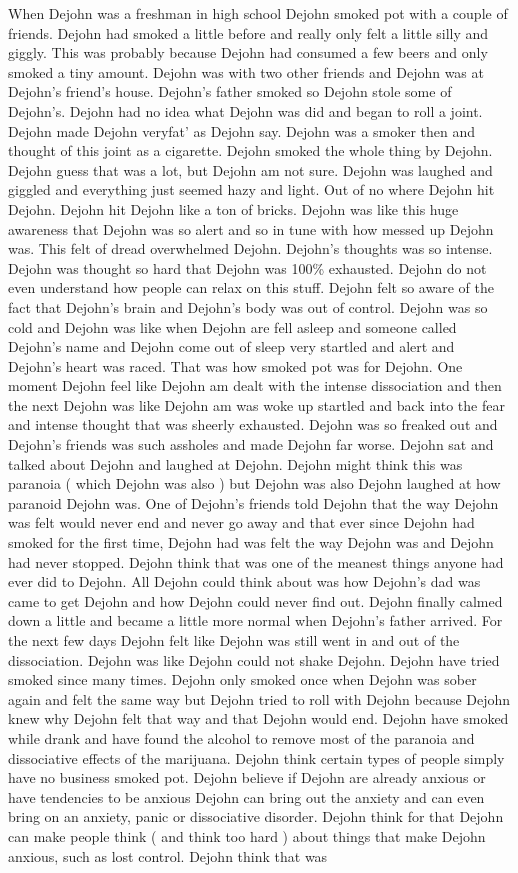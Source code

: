 \documentclass[12pt]{book}
\begin{document}
When Dejohn was a freshman in high school Dejohn smoked pot with a couple of friends. Dejohn had smoked a little before and really only felt a little silly and giggly. This was probably because Dejohn had consumed a few beers and only smoked a tiny amount. Dejohn was with two other friends and Dejohn was at Dejohn's friend's house. Dejohn's father smoked so Dejohn stole some of Dejohn's. Dejohn had no idea what Dejohn was did and began to roll a joint. Dejohn made Dejohn veryfat' as Dejohn say. Dejohn was a smoker then and thought of this joint as a cigarette. Dejohn smoked the whole thing by Dejohn. Dejohn guess that was a lot, but Dejohn am not sure. Dejohn was laughed and giggled and everything just seemed hazy and light. Out of no where Dejohn hit Dejohn. Dejohn hit Dejohn like a ton of bricks. Dejohn was like this huge awareness that Dejohn was so alert and so in tune with how messed up Dejohn was. This felt of dread overwhelmed Dejohn. Dejohn's thoughts was so intense. Dejohn was thought so hard that Dejohn was 100\% exhausted. Dejohn do not even understand how people can relax on this stuff. Dejohn felt so aware of the fact that Dejohn's brain and Dejohn's body was out of control. Dejohn was so cold and Dejohn was like when Dejohn are fell asleep and someone called Dejohn's name and Dejohn come out of sleep very startled and alert and Dejohn's heart was raced. That was how smoked pot was for Dejohn. One moment Dejohn feel like Dejohn am dealt with the intense dissociation and then the next Dejohn was like Dejohn am was woke up startled and back into the fear and intense thought that was sheerly exhausted. Dejohn was so freaked out and Dejohn's friends was such assholes and made Dejohn far worse. Dejohn sat and talked about Dejohn and laughed at Dejohn. Dejohn might think this was paranoia ( which Dejohn was also ) but Dejohn was also Dejohn laughed at how paranoid Dejohn was. One of Dejohn's friends told Dejohn that the way Dejohn was felt would never end and never go away and that ever since Dejohn had smoked for the first time, Dejohn had was felt the way Dejohn was and Dejohn had never stopped. Dejohn think that was one of the meanest things anyone had ever did to Dejohn. All Dejohn could think about was how Dejohn's dad was came to get Dejohn and how Dejohn could never find out. Dejohn finally calmed down a little and became a little more normal when Dejohn's father arrived. For the next few days Dejohn felt like Dejohn was still went in and out of the dissociation. Dejohn was like Dejohn could not shake Dejohn. Dejohn have tried smoked since many times. Dejohn only smoked once when Dejohn was sober again and felt the same way but Dejohn tried to roll with Dejohn because Dejohn knew why Dejohn felt that way and that Dejohn would end. Dejohn have smoked while drank and have found the alcohol to remove most of the paranoia and dissociative effects of the marijuana. Dejohn think certain types of people simply have no business smoked pot. Dejohn believe if Dejohn are already anxious or have tendencies to be anxious Dejohn can bring out the anxiety and can even bring on an anxiety, panic or dissociative disorder. Dejohn think for that Dejohn can make people think ( and think too hard ) about things that make Dejohn anxious, such as lost control. Dejohn think that was 
\end{document}
